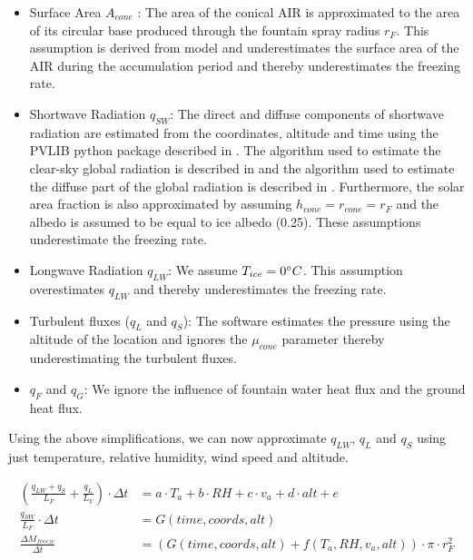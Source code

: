 \documentclass[utf8]{frontiersSCNS}
\begin{document}
\begin{itemize}

  \item Surface Area $A_{cone}$ : The area of the conical AIR is approximated to the area of its circular base produced
    through the fountain spray radius $r_F$. This assumption is derived from
    \cite{oerlemans-brief-communication-growth-2021} model and underestimates the surface area of the AIR during
    the accumulation period and thereby underestimates the freezing rate.

  \item Shortwave Radiation $q_{SW}$: The direct and diffuse components of shortwave radiation are estimated from the coordinates,
    altitude and time using the PVLIB python package described in \cite{pvlib_2018} . The algorithm used to
    estimate the clear-sky global radiation is described in and the algorithm used to estimate the diffuse part
    of the global radiation is described in . Furthermore, the solar area fraction is also approximated by
    assuming $h_{cone} = r_{cone} = r_{F}$ and the albedo is assumed to be equal to ice albedo (0.25). These
    assumptions underestimate the freezing rate.

  \item Longwave Radiation $q_{LW}$: We assume $T_{ice} = 0 \degree C$. This assumption overestimates $q_{LW}$ and thereby
    underestimates the freezing rate.

  \item Turbulent fluxes ($q_{L}$ and $q_{S}$): The software estimates the pressure using the altitude of the location and ignores
    the $\mu_{cone}$ parameter thereby underestimating the turbulent fluxes.

  \item $q_{F}$ and $q_{G}$: We ignore the influence of fountain water heat flux and the ground heat flux.

\end{itemize}

Using the above simplifications, we can now approximate $q_{LW}$, $q_{L}$ and $q_{S}$ using just temperature,
relative humidity, wind speed and altitude. 

\begin{subequations}
	\begin{align}
		\label{eqn:T}
  (\frac{q_{LW} + q_{S}}{L_F} + \frac{q_L}{L_V}) \cdot \Delta t & = a \cdot T_a + b \cdot RH + c \cdot v_a +
  d \cdot alt + e \\
		\label{eqn:sun}
  \frac{q_{SW}}{L_F}\cdot \Delta t & = G(time, coords, alt) \\
		\label{eqn:auto}
  \frac{\Delta M_{freeze}}{\Delta t} &= (G(time, coords, alt) + f(T_a, RH, v_a, alt)) \cdot \pi \cdot r_F^2 
	\end{align}
\end{subequations}
\end{document}
